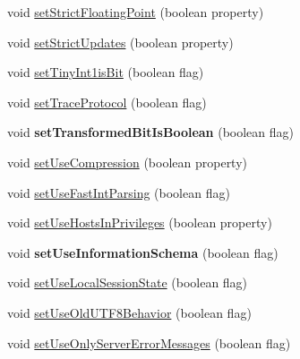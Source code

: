 \begin{DoxyCompactItemize}
\item 
void \mbox{\hyperlink{classcom_1_1mysql_1_1jdbc_1_1_connection_properties_impl_a015c113b8264ed8c7e876da6dabdd45d}{set\+Strict\+Floating\+Point}} (boolean property)
\item 
void \mbox{\hyperlink{classcom_1_1mysql_1_1jdbc_1_1_connection_properties_impl_af4a77c357657267b445886c49a4a5388}{set\+Strict\+Updates}} (boolean property)
\item 
void \mbox{\hyperlink{classcom_1_1mysql_1_1jdbc_1_1_connection_properties_impl_a6605c6ba04a1e83fb9f0ae6cb527a1fb}{set\+Tiny\+Int1is\+Bit}} (boolean flag)
\item 
void \mbox{\hyperlink{classcom_1_1mysql_1_1jdbc_1_1_connection_properties_impl_a892bbd7ef78aae4f95ab176b93c1829e}{set\+Trace\+Protocol}} (boolean flag)
\item 
\mbox{\label{classcom_1_1mysql_1_1jdbc_1_1_connection_properties_impl_af04fc9420d843e4a1f156572b6b63883}} 
void {\bfseries set\+Transformed\+Bit\+Is\+Boolean} (boolean flag)
\item 
void \mbox{\hyperlink{classcom_1_1mysql_1_1jdbc_1_1_connection_properties_impl_aafc68e81ecc49c1956434bd142d5ca1a}{set\+Use\+Compression}} (boolean property)
\item 
void \mbox{\hyperlink{classcom_1_1mysql_1_1jdbc_1_1_connection_properties_impl_ae1ca2a8981c38d1a0a31a25507299f1f}{set\+Use\+Fast\+Int\+Parsing}} (boolean flag)
\item 
void \mbox{\hyperlink{classcom_1_1mysql_1_1jdbc_1_1_connection_properties_impl_aabcdc99cc369972b7970a0f17f88367e}{set\+Use\+Hosts\+In\+Privileges}} (boolean property)
\item 
\mbox{\label{classcom_1_1mysql_1_1jdbc_1_1_connection_properties_impl_af9e52ed4eebc2d5ab5a41a0abe7ec3b2}} 
void {\bfseries set\+Use\+Information\+Schema} (boolean flag)
\item 
void \mbox{\hyperlink{classcom_1_1mysql_1_1jdbc_1_1_connection_properties_impl_a11a8cea3e36318544b06375913819d43}{set\+Use\+Local\+Session\+State}} (boolean flag)
\item 
void \mbox{\hyperlink{classcom_1_1mysql_1_1jdbc_1_1_connection_properties_impl_a107bd1adbf3a000c1814ae66a5193025}{set\+Use\+Old\+U\+T\+F8\+Behavior}} (boolean flag)
\item 
void \mbox{\hyperlink{classcom_1_1mysql_1_1jdbc_1_1_connection_properties_impl_a6db658411fe1661f96ab7089fa5e9345}{set\+Use\+Only\+Server\+Error\+Messages}} (boolean flag)

\end{DoxyCompactItemize}
